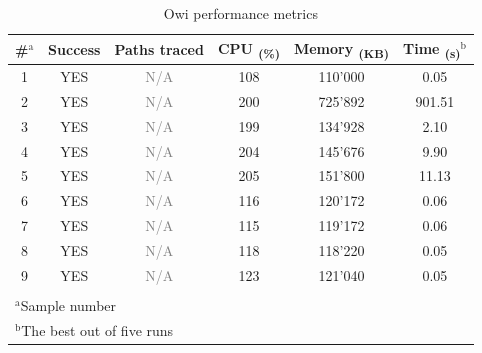 \begin{table}[tb]
    \begin{center}
    \caption{Owi performance metrics}
    \begin{tabular}{c|c|c|c|c|c}
        \#$^{\mathrm{a}}$ & Success & Paths traced & CPU \textsubscript{(\%)} & Memory \textsubscript{(KB)} & Time \textsubscript{(s)}$^{\mathrm{b}}$ \\
        \hline
        \hline
        1 & YES & \textcolor{gray}{N/A} & 108 & 110'000 & 0.05 \\
        2 & YES & \textcolor{gray}{N/A} & 200 & 725'892 & 901.51 \\
        3 & YES & \textcolor{gray}{N/A} & 199 & 134'928 & 2.10 \\
        4 & YES & \textcolor{gray}{N/A} & 204 & 145'676 & 9.90 \\
        5 & YES & \textcolor{gray}{N/A} & 205 & 151'800 & 11.13 \\
        6 & YES & \textcolor{gray}{N/A} & 116 & 120'172 & 0.06 \\
        7 & YES & \textcolor{gray}{N/A} & 115 & 119'172 & 0.06 \\
        8 & YES & \textcolor{gray}{N/A} & 118 & 118'220 & 0.05 \\
        9 & YES & \textcolor{gray}{N/A} & 123 & 121'040 & 0.05 \\
        \hline
        \multicolumn{6}{l}{}\\
        \multicolumn{6}{l}{$^{\mathrm{a}}$\footnotesize{Sample number}} \\
        \multicolumn{6}{l}{$^{\mathrm{b}}$\footnotesize{The best out of five runs}}
    \end{tabular}
    \end{center}
    \label{tab:owi_performance}
\end{table}


